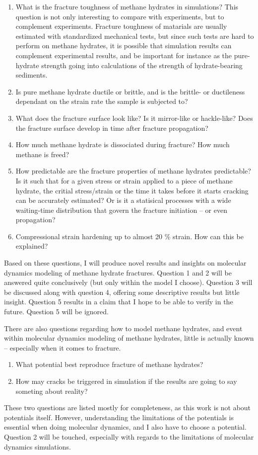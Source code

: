 \begin{enumerate}
\item What is the fracture toughness of methane hydrates in simulations? This question is not only interesting to compare with experiments, but to complement experiments. Fracture toughness of matarials are usually estimated with standardized mechanical tests, but since such tests are hard to perform on methane hydrates, it is possible that simulation results can complement experimental results, and be important for instance as the pure-hydrate strength going into calculations of the strength of hydrate-bearing sediments. 
\item Is pure methane hydrate ductile or brittle, and is the brittle- or ductileness dependant on the strain rate the sample is subjected to?
\item What does the fracture surface look like? Is it mirror-like or hackle-like? Does the fracture surface develop in time after fracture propagation?
\item How much methane hydrate is dissociated during fracture? How much methane is freed?
\item How predictable are the fracture properties of methane hydrates predictable? Is it such that for a given stress or strain applied to a piece of methane hydrate, the critial stress/strain or the time it takes before it starts cracking can be accurately estimated? Or is it a statisical processes with a wide waiting-time distribution that govern the fracture initiation -- or even propagation?
\item Compressional strain hardening up to almost 20 \% strain. How can this be explained?
\end{enumerate}
Based on these questions, I will produce novel results and insights on molecular dynamics modeling of methane hydrate fractures. Question 1 and 2 will be answered quite conclusively (but only within the model I choose). Question 3 will be discussed along with question 4, offering some descriptive results but little insight. Question 5 results in a claim that I hope to be able to verify in the future. Question 5 will be ignored.

There are also questions regarding how to model methane hydrates, and event within molecular dynamics modeling of methane hydrates, little is actually known -- especially when it comes to fracture. 

\begin{enumerate}
\item What potential best reproduce fracture of methane hydrates?
\item How may cracks be triggered in simulation if the results are going to say someting about reality?
\end{enumerate}
These two questions are listed mostly for completeness, as this work is not about potentials itself. However, understanding the limitations of the potentials is essential when doing molecular dynamics, and I also have to choose a potential. Question 2 will be touched, especially with regards to the limitations of molecular dynamics simulations. 
